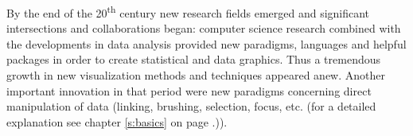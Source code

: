 By the end of the 20\textsuperscript{th} century new research fields emerged and significant intersections and collaborations began: computer science research combined with the developments in data analysis provided new paradigms, languages and helpful packages in order to create statistical and data graphics. Thus a tremendous growth in new visualization methods and techniques appeared anew.
Another important innovation in that period were new paradigms  concerning direct manipulation of data (linking, brushing, selection, focus, etc. (for a detailed explanation see chapter \ref{s:basics} on page \pageref{s:basics}.)).